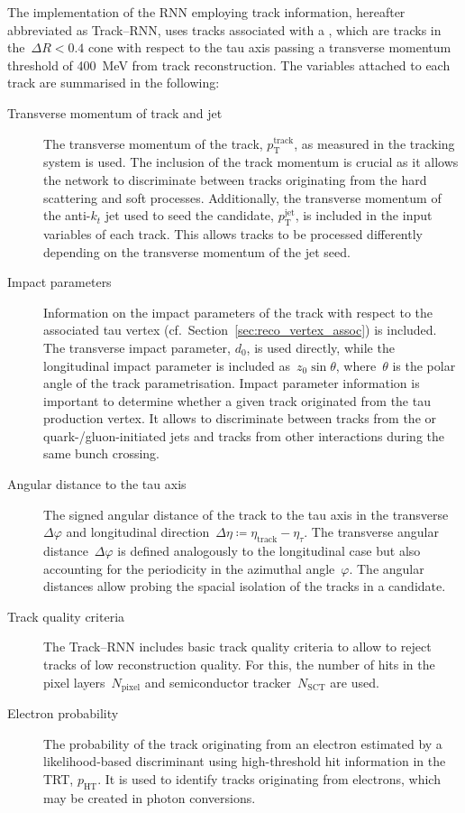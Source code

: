 The implementation of the RNN employing track information, hereafter abbreviated
as Track--RNN, uses tracks associated with a \tauhadvis, which are tracks in
the~$\Delta R < 0.4$ cone with respect to the tau axis passing a transverse
momentum threshold of \SI{400}{\MeV} from track reconstruction. The variables
attached to each track are summarised in the following:
\begin{description}
\item[Transverse momentum of track and jet] The transverse momentum of the
  track, $p_\text{T}^\text{track}$, as measured in the tracking system is used.
  The inclusion of the track momentum is crucial as it allows the network to
  discriminate between tracks originating from the hard scattering and soft
  processes. Additionally, the transverse momentum of the anti-$k_t$ jet used to
  seed the \tauhadvis candidate, $p_\text{T}^\text{jet}$, is included in the
  input variables of each track. This allows tracks to be processed differently
  depending on the transverse momentum of the jet seed.

\item[Impact parameters] Information on the impact parameters of the track with
  respect to the associated tau vertex (cf.\
  Section~\ref{sec:reco_vertex_assoc}) is included. The transverse impact
  parameter, $d_0$, is used directly, while the longitudinal impact parameter is
  included as~$z_0 \sin\theta$, where~$\theta$ is the polar angle of the track
  parametrisation.
  Impact parameter information is important to determine whether a given track
  originated from the tau production vertex. It allows to discriminate between
  tracks from the \tauhad or quark-/gluon-initiated jets and tracks from other
  interactions during the same bunch crossing.

\item[Angular distance to the tau axis] The signed angular distance of the track
  to the tau axis in the transverse~$\Delta \varphi$ and longitudinal
  direction~$\Delta \eta \coloneqq \eta_\text{track} - \eta_\tau$. The transverse
  angular distance~$\Delta \varphi$ is defined analogously to the longitudinal
  case but also accounting for the periodicity in the azimuthal angle~$\varphi$.
  The angular distances allow probing the spacial isolation of the tracks in a
  \tauhadvis candidate.

\item[Track quality criteria] The Track--RNN includes basic track quality
  criteria to allow to reject tracks of low reconstruction quality. For this,
  the number of hits in the pixel layers~$N_\text{pixel}$ and semiconductor
  tracker~$N_\text{SCT}$ are used.

\item[Electron probability] The probability of the track originating from an
  electron estimated by a likelihood-based discriminant using high-threshold hit
  information in the TRT, $p_\text{HT}$. It is used to identify tracks
  originating from electrons, which may be created in photon conversions.
\end{description}
